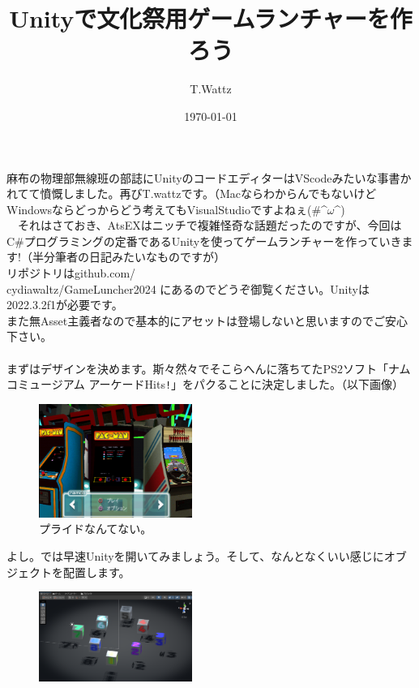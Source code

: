 \documentclass[b5paper,9pt,platex,dvipdfmx]{jsarticle}
\begin{document}
\title{Unityで文化祭用ゲームランチャーを作ろう}
\author{T.Wattz}
\date{\today}
\maketitle
\thispagestyle{empty}


\begin{multicols}{3}
麻布の物理部無線班の部誌にUnityのコードエディターはVScodeみたいな事書かれてて憤慨しました。再びT.wattzです。（MacならわからんでもないけどWindowsならどっからどう考えてもVisualStudioですよねぇ(\#\textasciicircum$ \omega$\textasciicircum)\\
　それはさておき、AtsEXはニッチで複雑怪奇な話題だったのですが、今回はC\#プログラミングの定番であるUnityを使ってゲームランチャーを作っていきます!（半分筆者の日記みたいなものですが）\\
リポジトリはgithub.com/\\
cydiawaltz/GameLuncher2024 にあるのでどうぞ御覧ください。Unityは2022.3.2f1が必要です。\\
また無Asset主義者なので基本的にアセットは登場しないと思いますのでご安心下さい。\\
\\
まずはデザインを決めます。斯々然々でそこらへんに落ちてたPS2ソフト「ナムコミュージアム アーケードHits\verb|!|」をパクることに決定しました。（以下画像）\\
\begin{figure}[H]
  \centering
  \includegraphics[width=5cm]{1.png}
  \caption{プライドなんてない。}
\end{figure}
よし。では早速Unityを開いてみましょう。そして、なんとなくいい感じにオブジェクトを配置します。\\
\begin{figure}[H]
  \centering
  \includegraphics[width=5cm]{2.png}

\end{figure}
\end{multicols}
\end{document}
